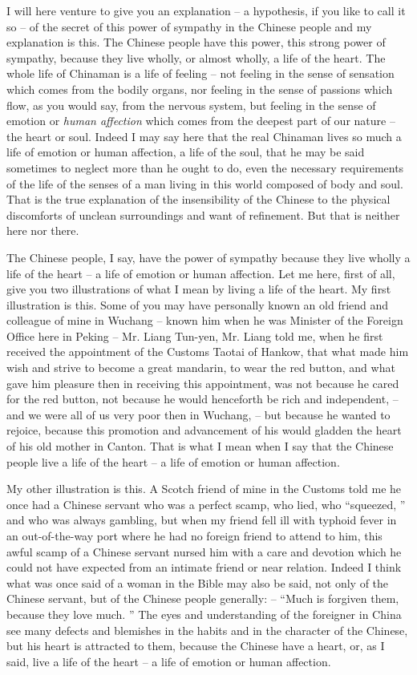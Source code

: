 I will here venture to give you an explanation -- a hypothesis,
if you like to call it so -- of the secret of this power of sympathy in the Chinese people and my explanation is this.
The Chinese people have this power, this strong power of sympathy, because they live wholly, or almost wholly, a life of the heart.
The whole life of Chinaman is a life of feeling -- not feeling in the sense of sensation which comes from the bodily organs, nor feeling in the sense of passions which flow, as you would say, from the nervous system, but feeling in the sense of emotion or \emph{human affection} which comes from the deepest part of our nature -- the heart or soul.
Indeed I may say here that the real Chinaman lives so much a life of emotion or human affection, a life of the soul, that he may be said sometimes to neglect more than he ought to do, even the necessary requirements of the life of the senses of a man living in this world composed of body and soul.
That is the true explanation of the insensibility of the Chinese to the physical discomforts of unclean surroundings and want of refinement.
But that is neither here nor there.

The Chinese people, I say, have the power of sympathy because they live wholly a life of the heart -- a life of emotion or human affection. Let me here, first of all, give you two illustrations of what I mean by living a life of the heart. My first illustration is this. Some of you may have personally known an old friend and colleague of mine in Wuchang -- known him when he was Minister of the Foreign Office here in Peking -- Mr. Liang Tun-yen, Mr. Liang told me, when he first received the appointment of the Customs Taotai of Hankow, that what made him wish and strive to become a great mandarin, to wear the red button, and what gave him pleasure then in receiving this appointment, was not because he cared for the red button, not because he would henceforth be rich and independent,  -- and we were all of us very poor then in Wuchang,  -- but because he wanted to rejoice, because this promotion and advancement of his would gladden the heart of his old mother in Canton. That is what I mean when I say that the Chinese people live a life of the heart -- a life of emotion or human affection.

My other illustration is this. A Scotch friend of mine in the Customs told me he once had a Chinese servant who was a perfect scamp, who lied, who ``squeezed, '' and who was always gambling, but when my friend fell ill with typhoid fever in an out-of-the-way port where he had no foreign friend to attend to him, this awful scamp of a Chinese servant nursed him with a care and devotion which he could not have expected from an intimate friend or near relation. Indeed I think what was once said of a woman in the Bible may also be said, not only of the Chinese servant, but of the Chinese people generally: -- ``Much is forgiven them, because they love much. '' The eyes and understanding of the foreigner in China see many defects and blemishes in the habits and in the character of the Chinese, but his heart is attracted to them, because the Chinese have a heart, or, as I said, live a life of the heart -- a life of emotion or human affection.


